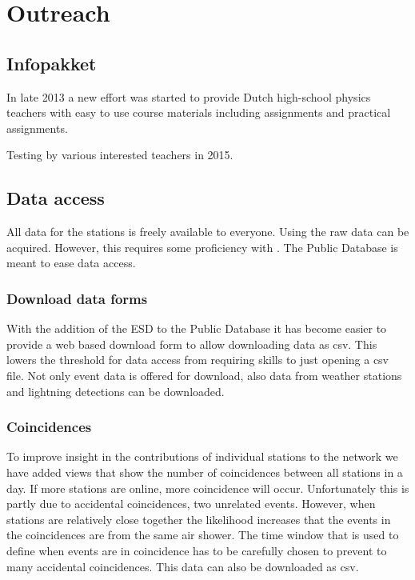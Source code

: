 \chapter{Outreach}
\label{ch:outreach}

\section{Infopakket}

In late 2013 a new effort was started to provide Dutch high-school
physics teachers with easy to use course materials including assignments
and practical assignments.

Testing by various interested teachers in 2015.


\section{Data access}

All data for the \hisparc stations is freely available to everyone.
Using \sapphire the raw data can be acquired. However, this requires
some proficiency with \python. The Public Database is meant to ease data
access.


\subsection{Download data forms}

With the addition of the ESD to the Public Database it has become easier
to provide a web based download form to allow downloading data as csv.
This lowers the threshold for data access from requiring \python skills
to just opening a csv file. Not only \hisparc event data is offered for
download, also data from \hisparc weather stations and \knmi lightning
detections can be downloaded.


\subsection{Coincidences}

To improve insight in the contributions of individual stations to the
\hisparc network we have added views that show the number of
coincidences between all \hisparc stations in a day. If more stations
are online, more coincidence will occur. Unfortunately this is partly
due to accidental coincidences, two unrelated events. However, when
stations are relatively close together the likelihood increases that the
events in the coincidences are from the same air shower. The time window
that is used to define when events are in coincidence has to be
carefully chosen to prevent to many accidental coincidences. This data
can also be downloaded as csv.


